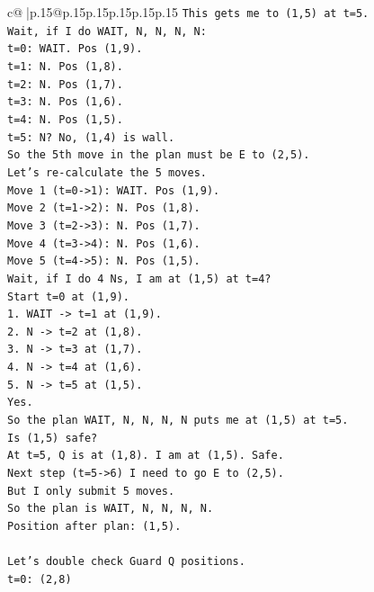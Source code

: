 \documentclass{article}
\begin{document}
{\begin{supertabular}{c@{$\;$}|p{.15\linewidth}@{}p{.15\linewidth}p{.15\linewidth}p{.15\linewidth}p{.15\linewidth}p{.15\linewidth}}
{{{\texttt{This gets me to (1,5) at t=5.} \\
\texttt{Wait, if I do WAIT, N, N, N, N:} \\
\texttt{t=0: WAIT. Pos (1,9).} \\
\texttt{t=1: N. Pos (1,8).} \\
\texttt{t=2: N. Pos (1,7).} \\
\texttt{t=3: N. Pos (1,6).} \\
\texttt{t=4: N. Pos (1,5).} \\
\texttt{t=5: N? No, (1,4) is wall.} \\
\texttt{So the 5th move in the plan must be E to (2,5).} \\
\texttt{Let's re{-}calculate the 5 moves.} \\
\texttt{Move 1 (t=0{-}>1): WAIT. Pos (1,9).} \\
\texttt{Move 2 (t=1{-}>2): N. Pos (1,8).} \\
\texttt{Move 3 (t=2{-}>3): N. Pos (1,7).} \\
\texttt{Move 4 (t=3{-}>4): N. Pos (1,6).} \\
\texttt{Move 5 (t=4{-}>5): N. Pos (1,5).} \\
\texttt{Wait, if I do 4 Ns, I am at (1,5) at t=4?} \\
\texttt{Start t=0 at (1,9).} \\
\texttt{1. WAIT {-}> t=1 at (1,9).} \\
\texttt{2. N {-}> t=2 at (1,8).} \\
\texttt{3. N {-}> t=3 at (1,7).} \\
\texttt{4. N {-}> t=4 at (1,6).} \\
\texttt{5. N {-}> t=5 at (1,5).} \\
\texttt{Yes.} \\
\texttt{So the plan WAIT, N, N, N, N puts me at (1,5) at t=5.} \\
\texttt{Is (1,5) safe?} \\
\texttt{At t=5, Q is at (1,8). I am at (1,5). Safe.} \\
\texttt{Next step (t=5{-}>6) I need to go E to (2,5).} \\
\texttt{But I only submit 5 moves.} \\
\texttt{So the plan is WAIT, N, N, N, N.} \\
\texttt{Position after plan: (1,5).} \\
\\ 
\texttt{Let's double check Guard Q positions.} \\
\texttt{t=0: (2,8)} \\
}}}
\end{supertabular}}
\end{document}
